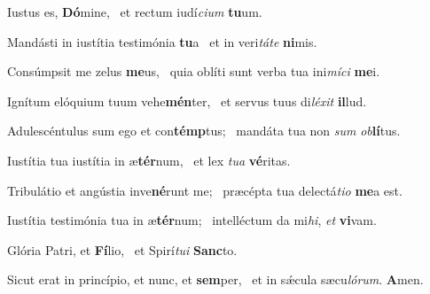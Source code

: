 \item Iustus es, \textbf{Dó}mine,~\psstar{} et rectum iudí\textit{cium} \textbf{tu}um.

\item Mandásti in iustítia testimónia \textbf{tu}a~\psstar{} et in veri\textit{táte} \textbf{ni}mis.

\item Consúmpsit me zelus \textbf{me}us,~\psstar{} quia oblíti sunt verba tua ini\textit{míci} \textbf{me}i.

\item Ignítum elóquium tuum vehe\textbf{mén}ter,~\psstar{} et servus tuus di\textit{léxit} \textbf{il}lud.

\item Adulescéntulus sum ego et con\textbf{témp}tus;~\psstar{} mandáta tua non \textit{sum} \textit{ob}\textbf{lí}tus.

\item Iustítia tua iustítia in æ\textbf{tér}num,~\psstar{} et lex \textit{tua} \textbf{vé}ritas.

\item Tribulátio et angústia inve\textbf{né}runt me;~\psstar{} præcépta tua delectá\textit{tio} \textbf{me}a est.

\item Iustítia testimónia tua in æ\textbf{tér}num;~\psstar{} intelléctum da mi\textit{hi}, \textit{et} \textbf{vi}vam.

\item Glória Patri, et \textbf{Fí}lio,~\psstar{} et Spirí\textit{tui} \textbf{Sanc}to.

\item Sicut erat in princípio, et nunc, et \textbf{sem}per,~\psstar{} et in sǽcula sæcu\textit{lórum}. \textbf{A}men.